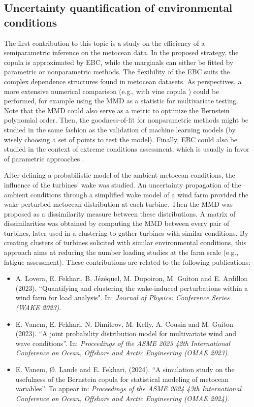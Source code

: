 \subsection*{Uncertainty quantification of environmental conditions}
The first contribution to this topic is a study on the efficiency of a semiparametric inference on the metocean data. 
In the proposed strategy, the copula is approximated by EBC, while the marginals can either be fitted by parametric or nonparametric methods.   
The flexibility of the EBC suits the complex dependence structures found in metocean datasets. 
As perspectives, a more extensive numerical comparison (e.g., with vine copula \citealp{vanem_2016,lin_2019_cvines_waves}) could be performed, for example using the MMD as a statistic for multivariate testing. 
Note that the MMD could also serve as a metric to optimize the Bernstein polynomial order. 
Then, the goodness-of-fit for nonparametric methods might be studied in the same fashion as the validation of machine learning models (by wisely choosing a set of points to test the model).
Finally, EBC could also be studied in the context of extreme conditions assessment, which is usually in favor of parametric approaches \citep{vanem_fekhari_2024}. 

After defining a probabilistic model of the ambient metocean conditions, the influence of the turbines' wake was studied. 
An uncertainty propagation of the ambient conditions through a simplified wake model of a wind farm provided the wake-perturbed metocean distribution at each turbine.  
Then the MMD was proposed as a dissimilarity measure between these distributions. 
A matrix of dissimilarities was obtained by computing the MMD between every pair of turbines, later used in a clustering to gather turbines with similar conditions.  
By creating clusters of turbines solicited with similar environmental conditions, this approach aims at reducing the number loading studies at the farm scale (e.g., fatigue assessment).
These contributions are related to the following publications:
\begin{itemize}
    \footnotesize
    \item[\ding{125}] A. Lovera, E. Fekhari, B. Jézéquel, M. Dupoiron, M. Guiton and E. Ardillon (2023). ``Quantifying and clustering the wake-induced perturbations within a wind farm for load analysis". In: \textit{Journal of Physics: Conference Series (WAKE 2023)}.
    \item[\ding{125}] E. Vanem, E. Fekhari, N. Dimitrov, M. Kelly, A. Cousin and M. Guiton (2023). ``A joint probability distribution model for multivariate wind and wave conditions''. In: \textit{Proceedings of the ASME 2023 42th International Conference on Ocean, Offshore and Arctic Engineering (OMAE 2023)}. 
    \item[\ding{125}] E. Vanem, \O{}. Lande and E. Fekhari, (2024). ``A simulation study on the usefulness of the Bernstein copula for statistical modeling of metocean variables''. To appear in: \textit{Proceedings of the ASME 2024 43th International Conference on Ocean, Offshore and Arctic Engineering (OMAE 2024)}.
\end{itemize}

